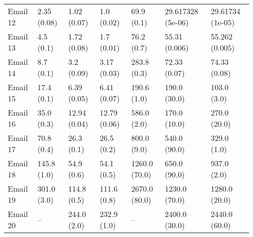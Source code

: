 \begin{tabular}{lllllll}
Email 12 &       2.35 (0.08) &           1.02 (0.07) &         1.0 (0.02) &              69.9 (0.1) &           29.617328 (5e-06) &         29.61734 (1e-05) \\
Email 13 &         4.5 (0.1) &           1.72 (0.08) &         1.7 (0.01) &              76.2 (0.7) &               55.31 (0.006) &           55.262 (0.005) \\
Email 14 &         8.7 (0.1) &            3.2 (0.09) &        3.17 (0.03) &             283.8 (0.3) &                72.33 (0.07) &             74.33 (0.08) \\
Email 15 &        17.4 (0.1) &           6.39 (0.05) &        6.41 (0.07) &             190.6 (1.0) &                190.0 (30.0) &              103.0 (3.0) \\
Email 16 &        35.0 (0.3) &          12.94 (0.04) &       12.79 (0.06) &             586.0 (2.0) &                170.0 (10.0) &             270.0 (20.0) \\
Email 17 &        70.8 (0.4) &            26.3 (0.1) &         26.5 (0.2) &             800.0 (9.0) &                540.0 (90.0) &              329.0 (1.0) \\
Email 18 &       145.8 (1.0) &            54.9 (0.6) &         54.1 (0.5) &           1260.0 (70.0) &                650.0 (90.0) &              937.0 (2.0) \\
Email 19 &       301.0 (3.0) &           114.8 (0.5) &        111.6 (0.8) &           2670.0 (80.0) &               1230.0 (70.0) &            1280.0 (20.0) \\
Email 20 &                -- &           244.0 (2.0) &        232.9 (1.0) &                      -- &               2400.0 (30.0) &            2440.0 (60.0) \\
\bottomrule
\end{tabular}
